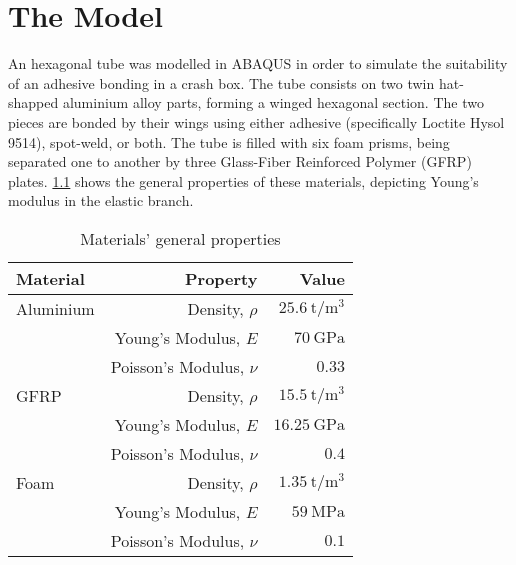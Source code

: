 \chapter{The Model}
\label{Chapter2}

An hexagonal tube was modelled in ABAQUS in order to simulate the suitability of an adhesive bonding in a crash box. The tube consists on two twin hat-shapped aluminium alloy parts, forming a winged hexagonal section. The two pieces are bonded by their wings using either adhesive (specifically Loctite Hysol 9514), spot-weld, or both. The tube is filled with six foam prisms, being separated one to another by three Glass-Fiber Reinforced Polymer (GFRP) plates. \ref{table:general_properties} shows the general properties of these materials, depicting Young's modulus in the elastic branch.


\begin{table}
\begin{tabular}{lrr}
  
  \toprule

  Material & Property & Value \\

  \midrule

  Aluminium & Density, $\rho$ & $\SI{25.6}{\tonne/\m^3}$ \\
  & Young's Modulus, $E$ & $\SI{70}{\GPa}$ \\
  & Poisson's Modulus, $\nu$ & $\num{0.33}$ \\
  
  \midrule

  GFRP & Density, $\rho$ & $\SI{15.5}{\tonne/\m^3}$ \\
  & Young's Modulus, $E$ & $\SI{16.25}{\GPa}$ \\
  & Poisson's Modulus, $\nu$ & $\num{0.4}$ \\
  
  \midrule

  Foam & Density, $\rho$ & $\SI{1.35}{\tonne/\m^3}$ \\
  & Young's Modulus, $E$ & $\SI{59}{\MPa}$ \\
  & Poisson's Modulus, $\nu$ & $\num{0.1}$ \\
  
  \bottomrule

\end{tabular}
\caption{Materials' general properties}
\label{table:general_properties}
\end{table}

